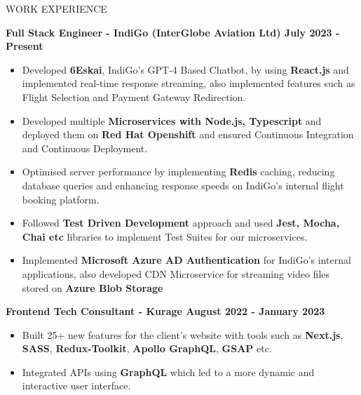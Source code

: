 \documentclass{resume} %
\begin{document}







\begin{rSection}{WORK EXPERIENCE}

{\bf Full Stack Engineer - IndiGo (InterGlobe Aviation Ltd)  \hfill July 2023 - Present }
\begin{itemize}
    \item {\normalfont Developed \textbf{6Eskai}, IndiGo's GPT-4 Based Chatbot, by using \textbf{React.js} and implemented real-time response streaming, also implemented features such as Flight Selection and Payment Gateway Redirection.}
    \item {\normalfont Developed multiple \textbf{Microservices with Node.js, Typescript} and deployed them on \textbf{Red Hat Openshift} and ensured Continuous Integration and Continuous Deployment.}
    \item {\normalfont Optimised server performance by implementing \textbf{Redis} caching, reducing database queries and enhancing response speeds on IndiGo's internal flight booking platform. }
    \item {\normalfont Followed \textbf{Test Driven Development} approach and used \textbf{Jest, Mocha, Chai etc} libraries to implement Test Suites for our microservices.}
    \item {\normalfont Implemented \textbf{Microsoft Azure AD Authentication} for IndiGo's internal applications, also developed CDN Microservice for streaming video files stored on \textbf{Azure Blob Storage}}
\end{itemize}


{\bf Frontend Tech Consultant - Kurage  \hfill August 2022 - January 2023 }
\begin{itemize}

    \item {\normalfont  Built 25+ new features for the client's website with tools such as \textbf{{Next.js}}, \textbf{{SASS}}, \textbf{{Redux-Toolkit}}, \textbf{{Apollo GraphQL}}, \textbf{{GSAP}} etc. }
   \item {\normalfont Integrated APIs using \textbf{{GraphQL}} which led to a more dynamic and interactive user interface.} 
 
\end{itemize}

\end{rSection}
\end{document}
